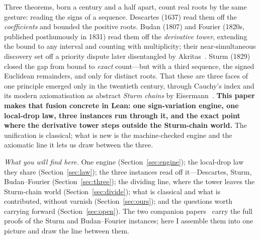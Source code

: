 \documentclass[11pt]{article}
\begin{document}
\medskip
\noindent Three theorems, born a century and a half apart, count real roots by the same gesture:
reading the signs of a sequence. Descartes (1637) read them off the \emph{coefficients} and bounded the
positive roots. Budan (1807) and Fourier (1820s, published posthumously in 1831) read them off the
\emph{derivative tower}, extending the bound to any interval and counting with multiplicity; their
near-simultaneous discovery set off a priority dispute later disentangled by Akritas~\cite{akritas}.
Sturm (1829) closed the gap from bound to \emph{exact} count---but with a third sequence, the signed
Euclidean remainders, and only for distinct roots. That these are three faces of one principle emerged
only in the twentieth century, through Cauchy's index and its modern axiomatisation as abstract
\emph{Sturm chains} by Eisermann~\cite{eisermann}. \textbf{This paper makes that fusion concrete in
Lean: one sign-variation engine, one local-drop law, three instances run through it, and the exact point
where the derivative tower steps outside the Sturm-chain world.} The unification is classical; what is
new is the machine-checked engine and the axiomatic line it lets us draw between the three.

\medskip
\noindent\emph{What you will find here.} One engine (Section~\ref{sec:engine}); the local-drop law they
share (Section~\ref{sec:law}); the three instances read off it---Descartes, Sturm, Budan--Fourier
(Section~\ref{sec:three}); the dividing line, where the tower leaves the Sturm-chain world
(Section~\ref{sec:divide}); what is classical and what is contributed, without varnish
(Section~\ref{sec:ours}); and the questions worth carrying forward (Section~\ref{sec:open}). The two
companion papers~\cite{sturmlean,budanlean} carry the full proofs of the Sturm and Budan--Fourier
instances; here I assemble them into one picture and draw the line between them.
\end{document}
